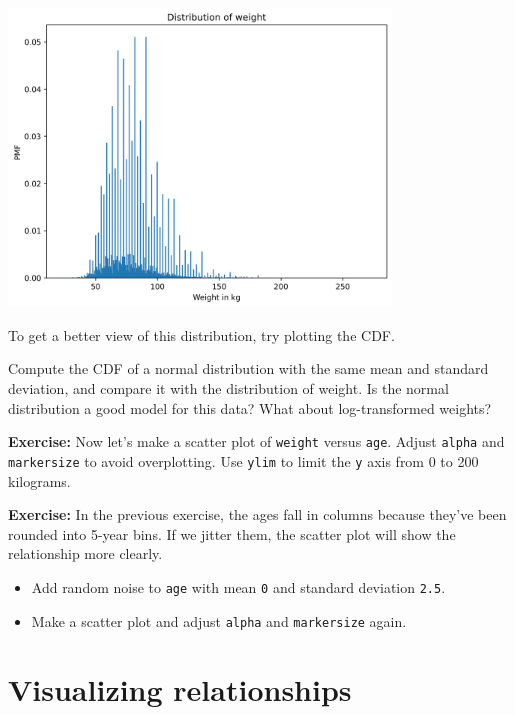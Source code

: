 \begin{center}
\includegraphics[width=4in]{chapters/09_relationships_files/09_relationships_33_0.png}
\end{center}

To get a better view of this distribution, try plotting the CDF.

Compute the CDF of a normal distribution with the same mean and standard
deviation, and compare it with the distribution of weight. Is the normal
distribution a good model for this data? What about log-transformed
weights?

\textbf{Exercise:} Now let's make a scatter plot of
\passthrough{\lstinline!weight!} versus \passthrough{\lstinline!age!}.
Adjust \passthrough{\lstinline!alpha!} and
\passthrough{\lstinline!markersize!} to avoid overplotting. Use
\passthrough{\lstinline!ylim!} to limit the \passthrough{\lstinline!y!}
axis from 0 to 200 kilograms.

\textbf{Exercise:} In the previous exercise, the ages fall in columns
because they've been rounded into 5-year bins. If we jitter them, the
scatter plot will show the relationship more clearly.

\begin{itemize}

\item
  Add random noise to \passthrough{\lstinline!age!} with mean
  \passthrough{\lstinline!0!} and standard deviation
  \passthrough{\lstinline!2.5!}.
\item
  Make a scatter plot and adjust \passthrough{\lstinline!alpha!} and
  \passthrough{\lstinline!markersize!} again.
\end{itemize}

\hypertarget{visualizing-relationships}{%
\section{Visualizing relationships}\label{visualizing-relationships}}

